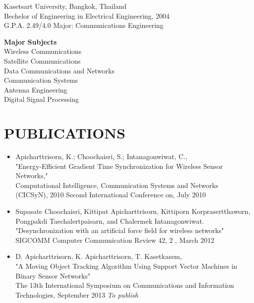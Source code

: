 \documentclass[margin]{res}
\begin{document}
\begin{resume}
				Kasetsart University, Bangkok, Thailand \\
		        Bechelor of Engineering in Electrical Engineering, 2004 \\
		        G.P.A. 2.49/4.0 
		        Major: Communications Engineering
		 
		        \begin{ncolumn}{1}
		        {\bf Major Subjects}   			 \\
		        Wireless Communications          \\
		        Satellite Communications		  \\
		        Data Communications and Networks  \\
		        Communication Systems             \\
		        Antenna Engineering   			  \\
		        Digital Signal Processing 		  \\
				\end{ncolumn}
 
\section{PUBLICATIONS}
\begin{itemize}
\item Apicharttrisorn, K.; Choochaisri, S.; Intanagonwiwat, C., \\ "Energy-Efficient Gradient Time Synchronization for Wireless Sensor Networks,"\\ Computational Intelligence, Communication Systems and Networks (CICSyN), 2010 Second International Conference on, July 2010
\item Supasate Choochaisri, Kittipat Apicharttrisorn, Kittiporn Korprasertthaworn, Pongpakdi Taechalertpaisarn, and Chalermek Intanagonwiwat.\\  
 "Desynchronization with an artificial force field for wireless networks" \\
SIGCOMM Computer Communication Review 42, 2 , March 2012
\item D. Apicharttrisorn, K. Apicharttrisorn, T. Kasetkasem, \\ "A Moving Object Tracking Algorithm Using Support Vector Machines in Binary Sensor Networks" \\ The 13th International Symposium on Communications and Information Technologies, September 2013 \textit{To publish} 
\end{itemize}

\end{resume}
\end{document}
